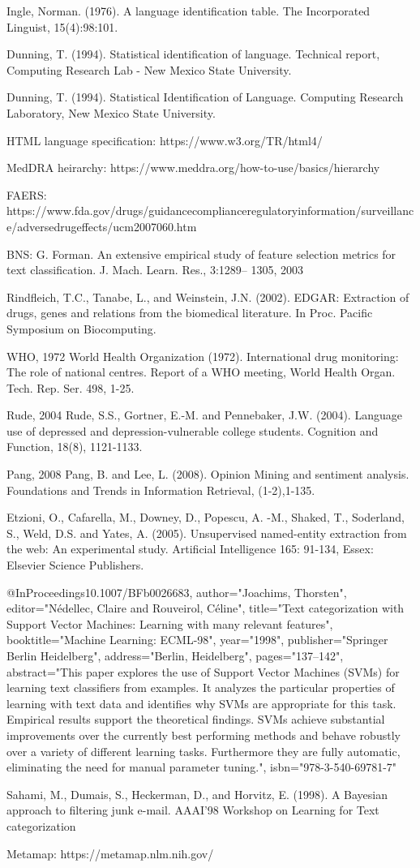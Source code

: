 \documentclass[twoside,11pt]{article}
\begin{document}
Ingle, Norman. (1976). A language identification table.
The Incorporated Linguist, 15(4):98:101.

Dunning, T. (1994). Statistical identification of language. Technical report, Computing
Research Lab - New Mexico State University.


Dunning, T. (1994). Statistical Identification of Language. Computing Research Laboratory,
New Mexico State University.

HTML language specification: https://www.w3.org/TR/html4/

MedDRA heirarchy:  https://www.meddra.org/how-to-use/basics/hierarchy

FAERS: https://www.fda.gov/drugs/guidancecomplianceregulatoryinformation/surveillance/adversedrugeffects/ucm2007060.htm

BNS:
G. Forman. An extensive empirical study of feature selection
metrics for text classification. J. Mach. Learn. Res., 3:1289–
1305, 2003


Rindfleich, T.C., Tanabe, L., and Weinstein, J.N. (2002). EDGAR: Extraction of drugs, genes and relations from the biomedical literature.  In Proc. Pacific Symposium on Biocomputing.


WHO, 1972
World Health Organization (1972). International drug monitoring: The role of national centres. Report of a WHO meeting, World Health  Organ. Tech. Rep. Ser. 498, 1-25.

Rude, 2004
Rude, S.S., Gortner, E.-M. and Pennebaker, J.W. (2004). Language use of depressed and depression-vulnerable college students. Cognition and Function, 18(8), 1121-1133.

Pang, 2008
Pang, B. and Lee, L. (2008). Opinion Mining and sentiment analysis.  Foundations and Trends in Information Retrieval, (1-2),1-135.

Etzioni, O., Cafarella, M., Downey, D., Popescu, A. -M., Shaked, T., Soderland, S., Weld, D.S. and Yates, A. (2005). Unsupervised named-entity extraction from the web: An experimental study.  Artificial Intelligence 165: 91-134, Essex: Elsevier Science Publishers.

@InProceedings{10.1007/BFb0026683,
author="Joachims, Thorsten",
editor="N{\'e}dellec, Claire
and Rouveirol, C{\'e}line",
title="Text categorization with Support Vector Machines: Learning with many relevant features",
booktitle="Machine Learning: ECML-98",
year="1998",
publisher="Springer Berlin Heidelberg",
address="Berlin, Heidelberg",
pages="137--142",
abstract="This paper explores the use of Support Vector Machines (SVMs) for learning text classifiers from examples. It analyzes the particular properties of learning with text data and identifies why SVMs are appropriate for this task. Empirical results support the theoretical findings. SVMs achieve substantial improvements over the currently best performing methods and behave robustly over a variety of different learning tasks. Furthermore they are fully automatic, eliminating the need for manual parameter tuning.",
isbn="978-3-540-69781-7"
}


Sahami, M., Dumais, S., Heckerman, D., and Horvitz, E. (1998). A Bayesian approach to filtering junk e-mail.   AAAI'98 Workshop on Learning for Text categorization





Metamap:
https://metamap.nlm.nih.gov/

\vskip 0.2in

\end{document}
